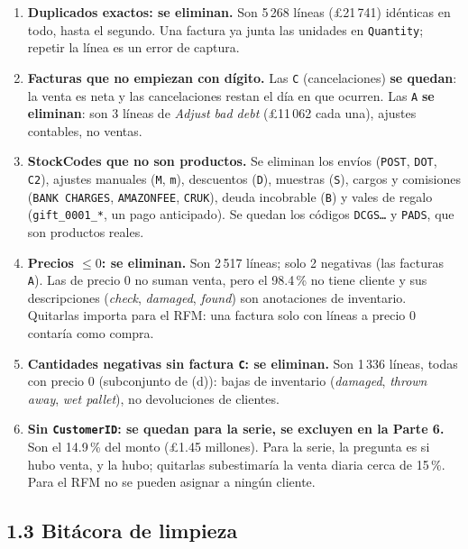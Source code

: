 \documentclass[11pt,letterpaper]{article}
\newcommand{\lib}{\pounds}
\begin{document}
\begin{enumerate}[label=(\alph*)]
\item \textbf{Duplicados exactos: se eliminan.} Son 5\,268 líneas (\lib21\,741) idénticas en todo, hasta el segundo. Una factura ya junta las unidades en \texttt{Quantity}; repetir la línea es un error de captura.
\item \textbf{Facturas que no empiezan con dígito.} Las \texttt{C} (cancelaciones) \textbf{se quedan}: la venta es neta y las cancelaciones restan el día en que ocurren. Las \texttt{A} \textbf{se eliminan}: son 3 líneas de \emph{Adjust bad debt} (\lib11\,062 cada una), ajustes contables, no ventas.
\item \textbf{StockCodes que no son productos.} Se eliminan los envíos (\texttt{POST}, \texttt{DOT}, \texttt{C2}), ajustes manuales (\texttt{M}, \texttt{m}), descuentos (\texttt{D}), muestras (\texttt{S}), cargos y comisiones (\texttt{BANK CHARGES}, \texttt{AMAZONFEE}, \texttt{CRUK}), deuda incobrable (\texttt{B}) y vales de regalo (\texttt{gift\_0001\_*}, un pago anticipado). Se quedan los códigos \texttt{DCGS\dots} y \texttt{PADS}, que son productos reales.
\item \textbf{Precios $\le 0$: se eliminan.} Son 2\,517 líneas; solo 2 negativas (las facturas \texttt{A}). Las de precio 0 no suman venta, pero el 98.4\,\% no tiene cliente y sus descripciones (\emph{check}, \emph{damaged}, \emph{found}) son anotaciones de inventario. Quitarlas importa para el RFM: una factura solo con líneas a precio 0 contaría como compra.
\item \textbf{Cantidades negativas sin factura \texttt{C}: se eliminan.} Son 1\,336 líneas, todas con precio 0 (subconjunto de (d)): bajas de inventario (\emph{damaged}, \emph{thrown away}, \emph{wet pallet}), no devoluciones de clientes.
\item \textbf{Sin \texttt{CustomerID}: se quedan para la serie, se excluyen en la Parte 6.} Son el 14.9\,\% del monto (\lib1.45 millones). Para la serie, la pregunta es si hubo venta, y la hubo; quitarlas subestimaría la venta diaria cerca de 15\,\%. Para el RFM no se pueden asignar a ningún cliente.
\end{enumerate}

\subsection*{1.3 Bitácora de limpieza}
\end{document}
